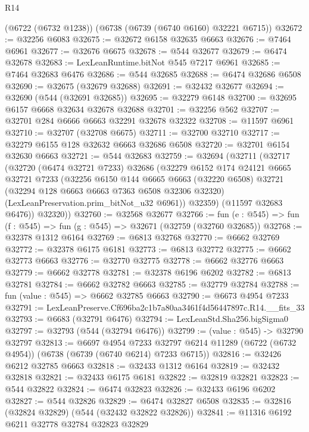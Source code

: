 \begin{lexlean}{R14}
\begin{coremodule}
    (@6722 (@6732 @1238))
    (@6738 (@6739 (@6740 @6160) @32221 @6715))
@32672 := @32256 @6083
@32675 := @32672 @6158 @32635 @6663
@32676 := @7464 @6961
@32677 := @32676 @6675
@32678 := @544 @32677
@32679 := @6474 @32678
@32683 := LexLeanRuntime.bitNot @545 @7217 @6961
@32685 := @7464 @32683 @6476
@32686 := @544 @32685
@32688 := @6474 @32686 @6508
@32690 := @32675 (@32679 @32688)
@32691 := @32432 @32677
@32694 := @32690 (@544 (@32691 @32685))
@32695 := @32279 @6148
@32700 := @32695 @6157 @6668 @32634 @32678 @32688
@32701 := @32256 @562
@32707 := @32701 @284 @6666 @6663 @32291 @32678 @32322
@32708 := @11597 @6961
@32710 := @32707 (@32708 @6675)
@32711 := @32700 @32710
@32717 := @32279 @6155 @128 @32632 @6663 @32686 @6508
@32720 := @32701 @6154 @32630 @6663
@32721 := @544 @32683
@32759 := @32694
    (@32711
      (@32717
        (@32720
          (@6474 @32721 @7233)
          @32686
          (@32279
            @6152
            @174
            @24121
            @6665
            @32721
            @7233
            (@32256
              @6150
              @144
              @6665
              @6663
              (@32220 @6508)
              @32721
              (@32294 @128 @6663 @6663 @7363 @6508 @32306 @32320)
              (LexLeanPreservation.prim_bitNot_u32 @6961))
            @32359)
          (@11597 @32683 @6476))
        @32320))
@32760 := @32568 @32677
@32766 := fun (e : @545) => fun (f : @545) => fun (g : @545) => @32671 (@32759 (@32760 @32685))
@32768 := @32378 @1312 @6164
@32769 := @6813 @32768
@32770 := @6662 @32769
@32772 := @32378 @6175 @6181
@32773 := @6813 @32772
@32775 := @6662 @32773 @6663
@32776 := @32770 @32775
@32778 := @6662 @32776 @6663
@32779 := @6662 @32778
@32781 := @32378 @6196 @6202
@32782 := @6813 @32781
@32784 := @6662 @32782 @6663
@32785 := @32779 @32784
@32788 := fun (value : @545) => @6662 @32785 @6663
@32790 := @6673 @4954 @7233
@32791 := LexLeanPreserve.Cf696ba2c1b7a80aa3461f4d56447897c.R14.__fits_33
@32793 := @6683 (@32791 @6476)
@32794 := LexLeanStd.Sha256.bigSigma0
@32797 := @32793 (@544 (@32794 @6476))
@32799 := (value : @545) -> @32790 @32797
@32813 := @6697
    @4954
    @7233
    @32797
    @6214
    @11289
    (@6722 (@6732 @4954))
    (@6738 (@6739 (@6740 @6214) @7233 @6715))
@32816 := @32426 @6212 @32785 @6663
@32818 := @32433 @1312 @6164
@32819 := @32432 @32818
@32821 := @32433 @6175 @6181
@32822 := @32819 @32821
@32823 := @544 @32822
@32824 := @6474 @32823
@32826 := @32433 @6196 @6202
@32827 := @544 @32826
@32829 := @6474 @32827 @6508
@32835 := @32816 (@32824 @32829) (@544 (@32432 @32822 @32826))
@32841 := @11316 @6192 @6211 @32778 @32784 @32823 @32829

\end{coremodule}
\end{lexlean}
